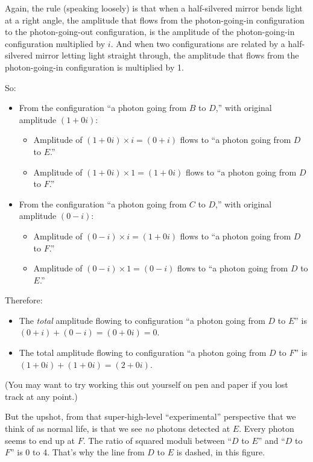 {
 Again, the rule (speaking loosely) is that when a half-silvered
mirror bends light at a right angle, the amplitude that flows from the
photon-going-in configuration to the photon-going-out configuration, is
the amplitude of the photon-going-in configuration multiplied by $i$. And
when two configurations are related by a half-silvered mirror letting
light straight through, the amplitude that flows from the
photon-going-in configuration is multiplied by 1.}

{
 So:}

\begin{itemize}
\item {
 From the configuration ``a photon going from $B$ to
 $D$,'' with original amplitude $(1 + 0i)$:
\begin{itemize}
\item Amplitude of
$(1 + 0i) \times i = (0 + i)$ flows to ``a photon
  going from $D$ to $E$.''
  \item Amplitude of $(1 + 0i)
\times 1 = (1 + 0i)$ flows to ``a photon going
from $D$ to $F$.''
\end{itemize}
}

\item {
 From the configuration ``a photon going from $C$ to
 $D$,'' with original amplitude $(0 - i)$:
 \begin{itemize}
   \item
 Amplitude of $(0
-i) \times i = (1 + 0i)$ flows to ``a photon
going from $D$ to $F$.''
\item Amplitude of $(0 - i)
\times 1 = (0 - i)$ flows to ``a photon going
from $D$ to $E$.''
\end{itemize}
}

\end{itemize}
{
 Therefore:}

\begin{itemize}
\item {
 The \textit{total} amplitude flowing to configuration
``a photon going from $D$ to $E$'' is $(0
+ i) + (0 - i) = (0 + 0i) = 0$.}

\item {
 The total amplitude flowing to configuration ``a
photon going from $D$ to $F$'' is $(1 + 0i) + (1 + 0i) =
(2 + 0i)$.}
\end{itemize}

{
 (You may want to try working this out yourself on pen and paper if
you lost track at any point.)}

{
 But the upshot, from that super-high-level
``experimental'' perspective that we
think of as normal life, is that we see \textit{no} photons detected at
$E$. Every photon seems to end up at $F$. The ratio of squared moduli
between ``$D$ to $E$'' and
``$D$ to $F$'' is 0 to 4.
That's why the line from $D$ to $E$ is dashed, in this
figure.}

